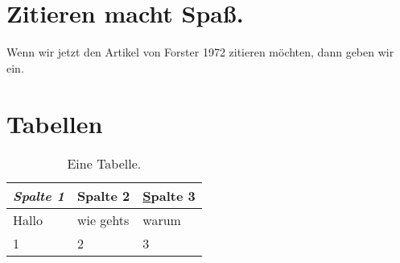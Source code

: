 \documentclass{article}
\begin{document}
\section{Zitieren macht Spaß.}
Wenn wir jetzt den Artikel von Forster 1972 zitieren möchten, dann geben wir \cite{Forster1972} ein.
\nocite{ForsterAna1}
\printbibliography
\section{Tabellen}
\begin{table}[H]
	\centering
	\caption{Eine Tabelle.}
	\begin{tabular}{l||ll}
		\hline
		\textit{Spalte 1} & \textbf{Spalte 2} & {\ul Spalte 3} \\ \hline
		Hallo             & wie gehts         & warum          \\ \hline
		1                 & 2                 & 3              \\ \hline
	\end{tabular}
	\label{tab:MeineErsteTabelle}
\end{table}
\end{document}
